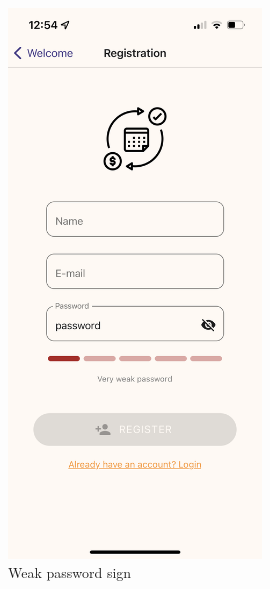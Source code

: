 \documentclass[11pt]{article}
\begin{document}
\begin{figure}[h!]
    \centering
    \begin{minipage}[c]{0.45\textwidth}
        \centering
        \includegraphics[width=0.6\textwidth, clip]{../../assets/smartphone/weak.PNG}
        \caption{Weak password sign}
        \label{fig:weak}
    \end{minipage}\hspace{1cm}%
    \begin{minipage}[c]{0.45\textwidth}
        \centering

\end{minipage}
\end{figure}
\end{document}
